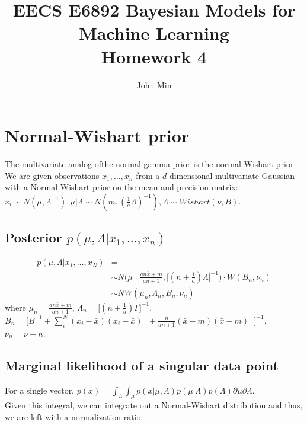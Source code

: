 \documentclass{article}
\author{John Min}
\title{EECS E6892 Bayesian Models for Machine Learning \\ Homework 4}
\begin{document}
\maketitle


\section{Normal-Wishart prior}

\noindent
The multivariate analog ofthe normal-gamma prior is the normal-Wishart prior. \\

\noindent
We are given observations $x_1, \ldots, x_n$ from a $d$-dimensional multivariate Gaussian with a Normal-Wishart prior on the mean and precision matrix:  $x_i \sim N(\mu, \Lambda^{-1}), \mu | \Lambda \sim N(m, (\frac{1}{a} \Lambda)^{-1}), \Lambda \sim Wishart(\nu, B).$  \\

\subsection{Posterior $p(\mu, \Lambda | x_1, \ldots, x_n)$}

\begin{align*}
p(\mu, \Lambda | x_1, \ldots, x_N) &= \\
& \sim N \Big(\mu \; \Bigr | \; \frac{an\bar x + m}{an+1}, \big[(n+\frac{1}{a})\Lambda \big]^{-1} \Big) \cdot W(B_n, \nu_n) \\
& \sim NW(\mu_n, \Lambda_n, B_n, \nu_n)
\end{align*}
where $\mu_n = \frac{an \bar x + m}{an+1}$, $\Lambda_n = \big[(n+\frac{1}{a})\Gamma\big]^{-1}$, $B_n = \Big[ B^{-1} + \displaystyle \sum_i^N (x_i - \bar x) (x_i - \bar x)^\top + \frac{n}{an+1} (\bar x - m)(\bar x - m)^\top \Big]^{-1}$, $\nu_n = \nu + n$.





\subsection{Marginal likelihood of a singular data point}
For a single vector, $p(x) = \int_\Lambda \int_\mu p(x|\mu, \Lambda) p(\mu|\Lambda) p(\Lambda) \partial \mu \partial \Lambda.$ \\

\noindent
Given this integral, we can integrate out a Normal-Wishart distribution and thus, we are left with a normalization ratio. \\
\end{document}
